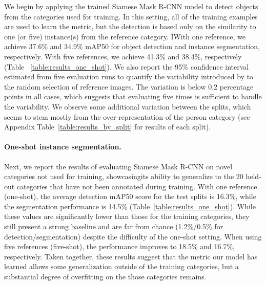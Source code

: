 \documentclass{article}
\begin{document}
We begin by applying the trained Siamese Mask R-CNN model to detect objects from the categories used for training. In this setting, all of the training examples are used to learn the metric, but the detection is based only on the similarity to one (or five) instance(s) from the reference category. IWith one reference, we achieve 37.6\% and 34.9\% mAP50 for object detection and instance segmentation, respectively. With five references, we achieve 41.3\% and 38.4\%, respectively (Table ~\ref{table:results_one_shot}). We also report the 95\% confidence interval estimated from five evaluation runs to quantify the variability introduced by to the random selection of reference images. The variation is below $0.2$ percentage points in all cases, which suggests that evaluating five times is sufficient to handle the variability. We observe some additional variation between the splits, which seems to stem mostly from the over-representation of the person category (see Appendix Table~\ref{table:results_by_split} for results of each split).


\paragraph{One-shot instance segmentation.}







Next, we report the results of evaluating Siamese Mask R-CNN on novel categories not used for training, showcasingits ability to generalize to the 20 held-out categories that have not been annotated during training. With one reference (one-shot), the average detection mAP50 score for the test splits is 16.3\%, while the segmentation performance is 14.5\% (Table~\ref{table:results_one_shot}).
While these values are significantly lower than those for the training categories, they still present a strong baseline and are far from chance (1.2\%/0.5\% for detection/segmentation) despite the difficulty of the one-shot setting. When using five references (five-shot), the performance improves to 18.5\% and 16.7\%, respectively. Taken together, these results suggest that the metric our model has learned allows some generalization outside of the training categories, but a substantial degree of overfitting on the those categories remains.
\end{document}
